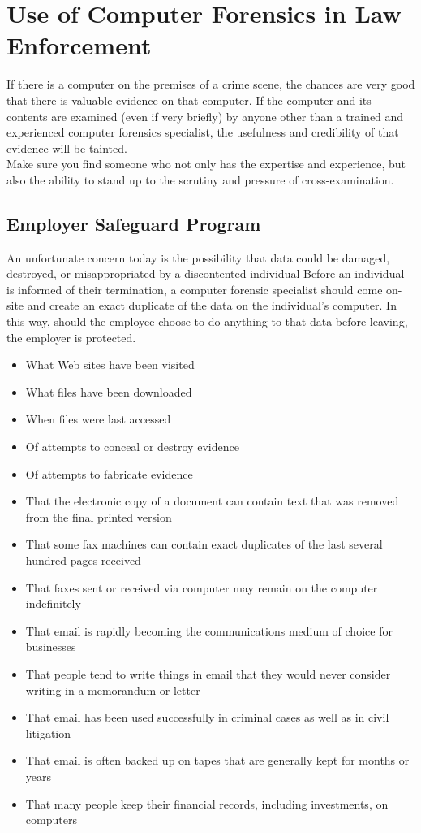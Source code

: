 \documentclass{scrreprt}
\begin{document}
\section{Use of Computer Forensics in Law Enforcement}
If there is a computer on the premises of a crime scene, the chances are very good that
there is valuable evidence on that computer. If the computer and its contents are examined (even if very briefly) by anyone other than a trained and experienced computer
forensics specialist, the usefulness and credibility of that evidence will be tainted.
\\Make sure you find someone who not only has the expertise and experience, but also the ability to stand up to the scrutiny and pressure of cross-examination.
\subsection{Employer Safeguard Program}
An unfortunate concern today is the possibility that data could be damaged, destroyed, or misappropriated by a discontented individual Before an individual is informed of their termination, a computer forensic specialist should come on-site and create an exact duplicate of the data on the individual’s computer. In this way, should the employee choose to do anything to that
data before leaving, the employer is protected.
\begin{itemize}
\item What Web sites have been visited
\item What files have been downloaded
\item When files were last accessed
\item Of attempts to conceal or destroy evidence
\item Of attempts to fabricate evidence
\item That the electronic copy of a document can contain text that was removed
from the final printed version
\item That some fax machines can contain exact duplicates of the last several hundred
pages received
\item That faxes sent or received via computer may remain on the computer indefinitely
\item That email is rapidly becoming the communications medium of choice for
businesses
\item That people tend to write things in email that they would never consider writing in a memorandum or letter
\item That email has been used successfully in criminal cases as well as in civil litigation
\item That email is often backed up on tapes that are generally kept for months or years
\item That many people keep their financial records, including investments, on
computers
\end{itemize}
\end{document}
